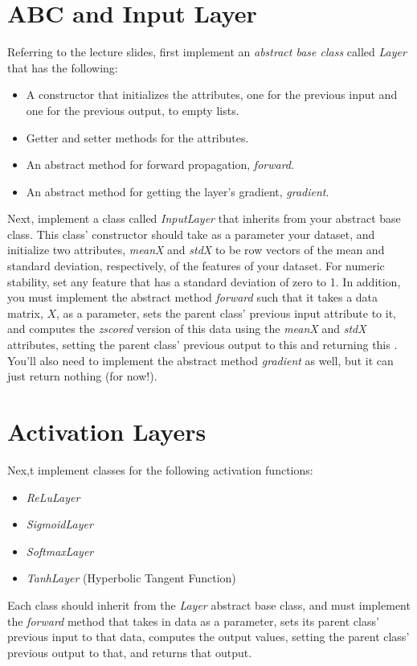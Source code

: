 \documentclass[12pt]{article}
\begin{document}
\newpage
\section{ABC and Input Layer}
Referring to the lecture slides, first implement an \emph{abstract base class} called \emph{Layer} that has the following:
\begin{itemize}
\item A constructor that initializes the attributes, one for the previous input and one for the previous output, to empty lists.
\item Getter and setter methods for the attributes.
\item An abstract method for forward propagation, \emph{forward}.
\item An abstract method for getting the layer's gradient, \emph{gradient}.
\end{itemize}

\noindent
Next, implement a class called \emph{InputLayer} that inherits from your abstract base class.  This class' constructor should take as a parameter your dataset, and initialize two attributes, \emph{meanX} and \emph{stdX} to be row vectors of the mean and standard deviation, respectively, of the features of your dataset. For numeric stability, set any feature that has a standard deviation of zero to 1.  In addition, you must implement the abstract method \emph{forward} such that it takes a data matrix, $X$, as a parameter, sets the parent class' previous input attribute to it, and computes the \emph{zscored} version of this data using the \emph{meanX} and \emph{stdX} attributes, setting the parent class' previous output to this and returning this .  You'll also need to implement the abstract method \emph{gradient} as well, but it can just return nothing (for now!).

\section{Activation Layers}
Nex,t implement classes for the following activation functions:
\begin{itemize}
\item \emph{ReLuLayer}
\item \emph{SigmoidLayer}
\item \emph{SoftmaxLayer}
\item \emph{TanhLayer} (Hyperbolic Tangent Function)
\end{itemize}

\noindent
Each class should inherit from the \emph{Layer} abstract base class, and must implement the \emph{forward} method that takes in data as a parameter, sets its parent class' previous input to that data, computes the output values, setting the parent class' previous output to that, and returns that output.
\end{document}
